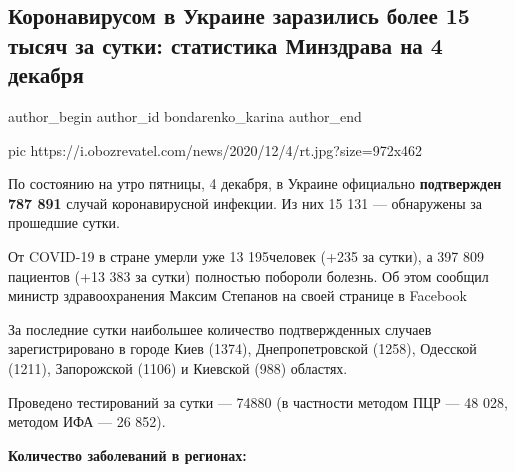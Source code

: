  
 
 
 
 
 
\subsection{Коронавирусом в Украине заразились более 15 тысяч за сутки: статистика Минздрава на 4 декабря}
\label{sec:04_12_2020.news.ua.obozrevatel.bondarenko_karina.1.kovid_statistics}
\ifcmt
	author_begin
   author_id bondarenko_karina
	author_end
\fi

\ifcmt
pic https://i.obozrevatel.com/news/2020/12/4/rt.jpg?size=972x462
\fi

По состоянию на утро пятницы, 4 декабря, в Украине официально \textbf{подтвержден 787
891} случай коронавирусной инфекции. Из них 15 131 --- обнаружены за прошедшие
сутки.

От COVID-19 в стране умерли уже 13 195человек (+235 за сутки), а 397 809
пациентов (+13 383 за сутки) полностью побороли болезнь. Об этом сообщил
министр здравоохранения Максим Степанов на своей странице в Facebook

За последние сутки наибольшее количество подтвержденных случаев
зарегистрировано в городе Киев (1374), Днепропетровской (1258), Одесской
(1211), Запорожской (1106) и Киевской (988) областях.

Проведено тестирований за сутки --- 74880 (в частности методом ПЦР --- 48 028,
методом ИФА --- 26 852).

\textbf{Количество заболеваний в регионах:}

